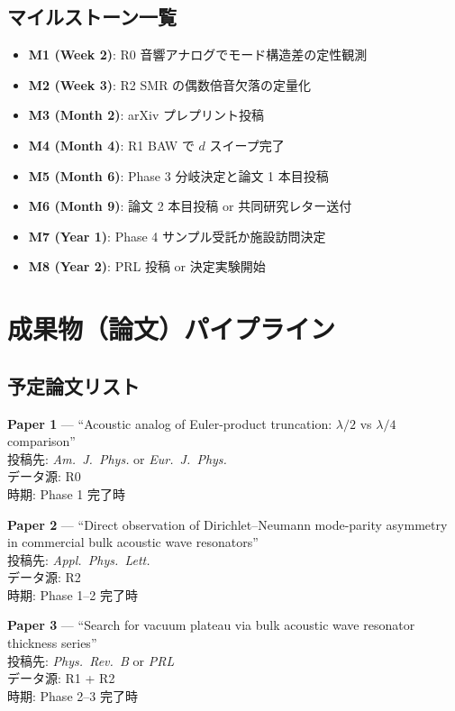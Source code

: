 \documentclass[11pt,a4paper]{article}
\begin{document}
\subsection{マイルストーン一覧}

\begin{itemize}
\item \textbf{M1 (Week 2)}: R0 音響アナログでモード構造差の定性観測
\item \textbf{M2 (Week 3)}: R2 SMR の偶数倍音欠落の定量化
\item \textbf{M3 (Month 2)}: arXiv プレプリント投稿
\item \textbf{M4 (Month 4)}: R1 BAW で $d$ スイープ完了
\item \textbf{M5 (Month 6)}: Phase 3 分岐決定と論文 1 本目投稿
\item \textbf{M6 (Month 9)}: 論文 2 本目投稿 or 共同研究レター送付
\item \textbf{M7 (Year 1)}: Phase 4 サンプル受託か施設訪問決定
\item \textbf{M8 (Year 2)}: PRL 投稿 or 決定実験開始
\end{itemize}

\section{成果物（論文）パイプライン}

\subsection{予定論文リスト}

\textbf{Paper 1} — ``Acoustic analog of Euler-product truncation:
$\lambda/2$ vs $\lambda/4$ comparison''\\
投稿先: \textit{Am.\ J.\ Phys.} or \textit{Eur.\ J.\ Phys.}\\
データ源: R0\\
時期: Phase 1 完了時

\textbf{Paper 2} — ``Direct observation of Dirichlet--Neumann
mode-parity asymmetry in commercial bulk acoustic wave resonators''\\
投稿先: \textit{Appl.\ Phys.\ Lett.}\\
データ源: R2\\
時期: Phase 1--2 完了時

\textbf{Paper 3} — ``Search for vacuum plateau via bulk acoustic
wave resonator thickness series''\\
投稿先: \textit{Phys.\ Rev.\ B} or \textit{PRL}\\
データ源: R1 + R2\\
時期: Phase 2--3 完了時
\end{document}
